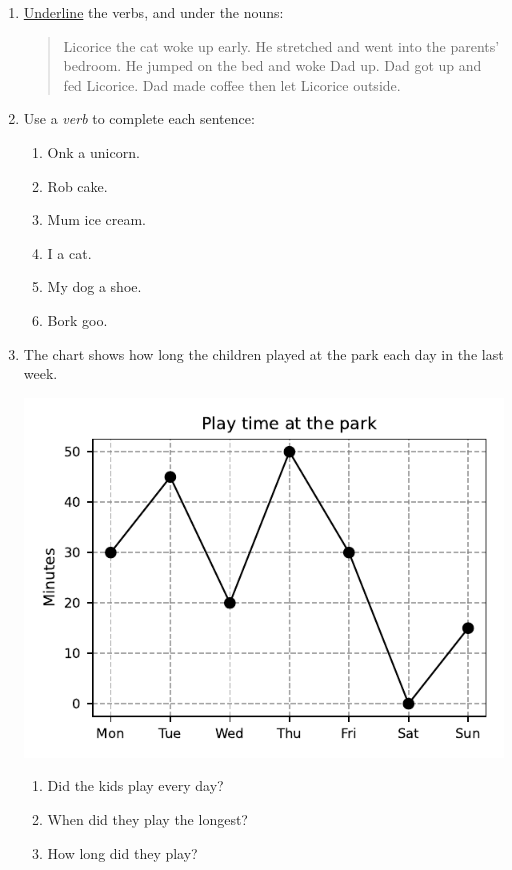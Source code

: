 \documentclass{tufte-book}
\begin{document}
\begin{enumerate}
  \item \underline{Underline} the verbs, and  under the nouns:
  \begin{quote}
    Licorice the cat woke up early. He stretched and went into the parents' bedroom.
    He jumped on the bed and woke Dad up. Dad got up and fed Licorice. Dad made coffee
    then let Licorice outside.
  \end{quote}

  \item Use a \emph{verb} to complete each sentence:
  \begin{multicols}{2}
  \begin{enumerate}
    \item Onk \dotfill a unicorn.\bigskip
    \item Rob \dotfill cake.\bigskip
    \item Mum \dotfill ice cream.
    \item I \dotfill a cat.\bigskip
    \item My dog \dotfill a shoe.\bigskip
    \item Bork \dotfill goo.
  \end{enumerate}
  \end{multicols}

  \item The chart shows how long the children played at the park each day in the last week.
  \begin{marginfigure}\includegraphics[width=\textwidth]{maths/fig/play_at_park.pdf}\end{marginfigure}
  \begin{enumerate}
    \item Did the kids play every day?\dotfill\bigskip
    \item When did they play the longest?\dotfill\bigskip
    \item How long did they play?\dotfill\bigskip
  \end{enumerate}


\end{enumerate}
\end{document}
